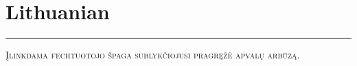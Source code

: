 
\vspace{-1em}\section*{\checkno Lithuanian}
\vspace{-.5em}\hrule\vspace{.5em}
\noindent\textsc{Įlinkdama fechtuotojo špaga sublykčiojusi pragręžė apvalų arbūzą.}